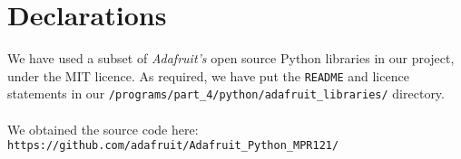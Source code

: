 \documentclass[11pt]{article}
\begin{document}
\section{Declarations}
We have used a subset of \textit{Adafruit's} open source Python libraries in our project, under the MIT licence. As required, we have put the \texttt{README} and licence statements in our \texttt{/programs/part{\_}4/python/adafruit{\_}libraries/} directory.\\ \\
We obtained the source code here:
\texttt{https://github.com/adafruit/Adafruit{\_}Python{\_}MPR121/}
\end{document}
